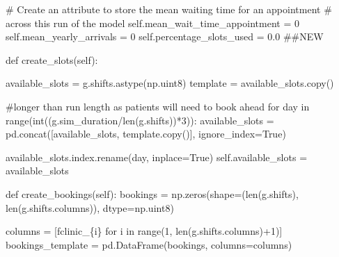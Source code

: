 \documentclass[
  letterpaper,
  DIV=11,
  numbers=noendperiod]{scrreprt}
\newenvironment{Shaded}{\begin{snugshade}}{\end{snugshade}}
\newcommand{\BuiltInTok}[1]{\textcolor[rgb]{0.00,0.23,0.31}{#1}}
\newcommand{\CommentTok}[1]{\textcolor[rgb]{0.37,0.37,0.37}{#1}}
\newcommand{\ControlFlowTok}[1]{\textcolor[rgb]{0.00,0.23,0.31}{#1}}
\newcommand{\DecValTok}[1]{\textcolor[rgb]{0.68,0.00,0.00}{#1}}
\newcommand{\FloatTok}[1]{\textcolor[rgb]{0.68,0.00,0.00}{#1}}
\newcommand{\KeywordTok}[1]{\textcolor[rgb]{0.00,0.23,0.31}{#1}}
\newcommand{\NormalTok}[1]{\textcolor[rgb]{0.00,0.23,0.31}{#1}}
\newcommand{\OperatorTok}[1]{\textcolor[rgb]{0.37,0.37,0.37}{#1}}
\newcommand{\SpecialCharTok}[1]{\textcolor[rgb]{0.37,0.37,0.37}{#1}}
\newcommand{\SpecialStringTok}[1]{\textcolor[rgb]{0.13,0.47,0.30}{#1}}
\newcommand{\StringTok}[1]{\textcolor[rgb]{0.13,0.47,0.30}{#1}}
\newcommand{\VariableTok}[1]{\textcolor[rgb]{0.07,0.07,0.07}{#1}}
\begin{document}
\begin{Shaded}
\begin{Highlighting}[]
        \CommentTok{\# Create an attribute to store the mean waiting time for an appointment}
        \CommentTok{\# across this run of the model}
        \VariableTok{self}\NormalTok{.mean\_wait\_time\_appointment }\OperatorTok{=} \DecValTok{0}
        \VariableTok{self}\NormalTok{.mean\_yearly\_arrivals }\OperatorTok{=} \DecValTok{0}
        \VariableTok{self}\NormalTok{.percentage\_slots\_used }\OperatorTok{=} \FloatTok{0.0} \CommentTok{\#\#NEW}

    \KeywordTok{def}\NormalTok{ create\_slots(}\VariableTok{self}\NormalTok{):}

\NormalTok{        available\_slots }\OperatorTok{=}\NormalTok{ g.shifts.astype(np.uint8)}
\NormalTok{        template }\OperatorTok{=}\NormalTok{ available\_slots.copy()}

        \CommentTok{\#longer than run length as patients will need to book ahead}
        \ControlFlowTok{for}\NormalTok{ day }\KeywordTok{in} \BuiltInTok{range}\NormalTok{(}\BuiltInTok{int}\NormalTok{((g.sim\_duration}\OperatorTok{/}\BuiltInTok{len}\NormalTok{(g.shifts))}\OperatorTok{*}\DecValTok{3}\NormalTok{)):}
\NormalTok{            available\_slots }\OperatorTok{=}\NormalTok{ pd.concat([available\_slots, template.copy()],}
\NormalTok{                                         ignore\_index}\OperatorTok{=}\VariableTok{True}\NormalTok{)}

\NormalTok{        available\_slots.index.rename(}\StringTok{\textquotesingle{}day\textquotesingle{}}\NormalTok{, inplace}\OperatorTok{=}\VariableTok{True}\NormalTok{)}
        \VariableTok{self}\NormalTok{.available\_slots }\OperatorTok{=}\NormalTok{ available\_slots}

    \KeywordTok{def}\NormalTok{ create\_bookings(}\VariableTok{self}\NormalTok{):}
\NormalTok{        bookings }\OperatorTok{=}\NormalTok{ np.zeros(shape}\OperatorTok{=}\NormalTok{(}\BuiltInTok{len}\NormalTok{(g.shifts), }\BuiltInTok{len}\NormalTok{(g.shifts.columns)), dtype}\OperatorTok{=}\NormalTok{np.uint8)}

\NormalTok{        columns }\OperatorTok{=}\NormalTok{ [}\SpecialStringTok{f\textquotesingle{}clinic\_}\SpecialCharTok{\{}\NormalTok{i}\SpecialCharTok{\}}\SpecialStringTok{\textquotesingle{}} \ControlFlowTok{for}\NormalTok{ i }\KeywordTok{in} \BuiltInTok{range}\NormalTok{(}\DecValTok{1}\NormalTok{, }\BuiltInTok{len}\NormalTok{(g.shifts.columns)}\OperatorTok{+}\DecValTok{1}\NormalTok{)]}
\NormalTok{        bookings\_template }\OperatorTok{=}\NormalTok{ pd.DataFrame(bookings, columns}\OperatorTok{=}\NormalTok{columns)}


\end{Highlighting}
\end{Shaded}
\end{document}
